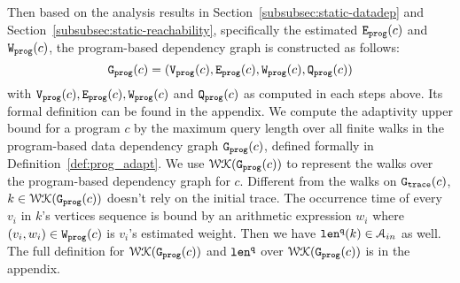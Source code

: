 
Then based on the analysis results in Section~\ref{subsubsec:static-datadep} and 
Section~\ref{subsubsec:static-reachability},
specifically the estimated $\mathtt{{E_{prog}}}(c)$ and $\mathtt{{W_{prog}}}(c)$,
the program-based dependency graph is constructed as follows:
{
   \[
     \mathtt{{G_{prog}}}(c) = (\mathtt{{V_{prog}}}(c), \mathtt{{E_{prog}}}(c), \mathtt{{W_{prog}}}(c), \mathtt{{Q_{prog}}}(c))
     \]
 }
 with $\mathtt{{V_{prog}}}(c), \mathtt{{E_{prog}}}(c), \mathtt{{W_{prog}}}(c)$ and $ \mathtt{{Q_{prog}}}(c)$ as computed in each steps above.
 Its formal definition can be found in the appendix.
 We compute the adaptivity upper bound for a program $c$ by the maximum query length over all finite walks in the program-based data dependency graph $\mathtt{{G_{prog}}}({c})$, defined  formally in Definition~\ref{def:prog_adapt}. 
 We use $\mathcal{WK}(\mathtt{{G_{prog}}}(c))$ to represent the walks over the program-based dependency graph for $c$.
 Different from the walks on $\mathtt{{G_{trace}}}(c)$, $k \in \mathcal{WK}(\mathtt{{G_{prog}}}(c))$ doesn't rely on the initial trace.
 The occurrence time of every $v_i $ in $k$'s vertices sequence is bound by 
 an arithmetic expression $w_i$ where $(v_i, w_i) \in \mathtt{{W_{prog}}}(c)$ is $v_i$'s estimated weight. Then we have $\mathtt{len}^{\tt q}(k) \in \mathcal{A}_{in}$ as well. The full definition for $\mathcal{WK}(\mathtt{{G_{prog}}}(c))$ and $\mathtt{len}^{\tt q}$ over $\mathcal{WK}(\mathtt{{G_{prog}}}(c))$ is in the appendix.
 
 
